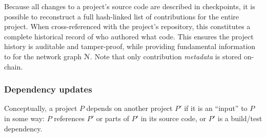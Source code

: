 Because all changes to a project's source code are described in checkpoints, it
is possible to reconstruct a full hash-linked list of contributions for the
entire project. When cross-referenced with the project's repository, this
constitutes a complete historical record of who authored what code. This
ensures the project history is auditable and tamper-proof, while providing
fundamental information to for the network graph $\mathcal{N}$. Note that only
contribution \emph{metadata} is stored on-chain.

\subsubsection{Dependency updates}
\label{s:checkpoint-deps}
Conceptually, a project $P$ depends on another project $P'$ if it is an
``input'' to $P$ in some way: $P$ references $P'$ or parts of $P'$ in its
source code, or $P'$ is a build/test dependency.

